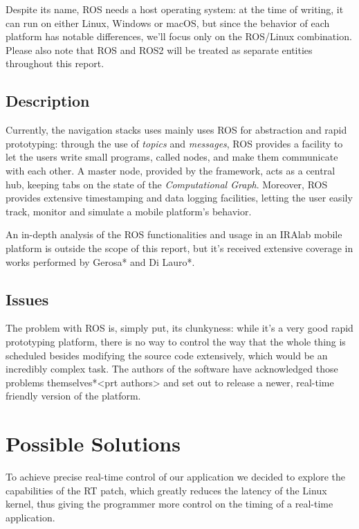 \documentclass[a4paper,12pt]{report}
\begin{document}
Despite its name, ROS needs a host operating system: at the time of writing, it can run on either Linux, Windows or macOS, but since the behavior of each platform has notable differences, we'll focus only on the ROS/Linux combination. Please also note that ROS and ROS2 will be treated as separate entities throughout this report.

\subsection{Description}

Currently, the navigation stacks uses mainly uses ROS for abstraction and rapid prototyping: through the use of \textit{topics} and \textit{messages}, ROS provides a facility to let the users write small programs, called nodes, and make them communicate with each other. A master node, provided by the framework, acts as a central hub, keeping tabs on the state of the \textit{Computational Graph}. Moreover, ROS provides extensive timestamping and data logging facilities, letting the user easily track, monitor and simulate a mobile platform's behavior.

An in-depth analysis of the ROS functionalities and usage in an IRAlab mobile platform is outside the scope of this report, but it's received extensive coverage in works performed by Gerosa* and Di Lauro*.

\subsection{Issues}

The problem with ROS is, simply put, its clunkyness: while it's a very good rapid prototyping platform, there is no way to control the way that the whole thing is scheduled besides modifying the source code extensively, which would be an incredibly complex task. The authors of the software have acknowledged those problems themselves*<prt authors> and set out to release a newer, real-time friendly version of the platform.


\section{Possible Solutions}

To achieve precise real-time control of our application we decided to explore the capabilities of the RT patch, which greatly reduces the latency of the Linux kernel, thus giving the programmer more control on the timing of a real-time application. 
\end{document}
